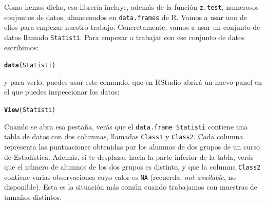 \documentclass[10pt,a4paper]{article}\usepackage[]{graphicx}\usepackage[]{color}
\makeatletter
\newcommand{\hlstd}[1]{\textcolor[rgb]{0.345,0.345,0.345}{#1}}%
\newcommand{\hlkwd}[1]{\textcolor[rgb]{0.737,0.353,0.396}{\textbf{#1}}}%
\newenvironment{kframe}{%
 \def\at@end@of@kframe{}%
 \ifinner\ifhmode%
  \def\at@end@of@kframe{\end{minipage}}%
  \begin{minipage}{\columnwidth}%
 \fi\fi%
 \def\FrameCommand##1{\hskip\@totalleftmargin \hskip-\fboxsep
 \colorbox{shadecolor}{##1}\hskip-\fboxsep
     \hskip-\linewidth \hskip-\@totalleftmargin \hskip\columnwidth}%
 \MakeFramed {\advance\hsize-\width
   \@totalleftmargin\z@ \linewidth\hsize
   \@setminipage}}%
 {\par\unskip\endMakeFramed%
 \at@end@of@kframe}
\newenvironment{knitrout}{}{} %
\newcounter {cont01}
\makeatother
\begin{document}
Como hemos dicho, esa librería incluye, además de la función {\tt z.test}, numerosos conjuntos de datos, almacenados en {\tt data.frames} de R. Vamos a usar uno de ellos para empezar nuestro trabajo. Concretamente, vamos a usar un conjunto de datos llamado {\tt Statisti}. Para empezar a trabajar con ese conjunto de datos escribimos:
\begin{knitrout}
\color{fgcolor}\begin{kframe}
\begin{alltt}
\hlkwd{data}\hlstd{(Statisti)}
\end{alltt}
\end{kframe}
\end{knitrout}
y para verlo, puedes usar este comando, que en RStudio abrirá un nuevo panel en el que puedes inspeccionar los datos:
\begin{knitrout}
\color{fgcolor}\begin{kframe}
\begin{alltt}
\hlkwd{View}\hlstd{(Statisti)}
\end{alltt}
\end{kframe}
\end{knitrout}
Cuando se abra esa pestaña, verás que el {\tt data.frame Statisti} contiene una tabla de datos con dos columnas, llamadas  {\tt Class1} y {\tt Class2}. Cada columna representa las puntuaciones obtenidas por los alumnos de dos grupos de un curso de Estadística.  Además, si te desplazas hacia la parte inferior de la tabla, verás que el número de alumnos de los dos grupos es distinto, y que la columna {\tt Class2} contiene varias observaciones cuyo valor es {\tt NA} (recuerda, {\em not available}, no disponible). Esta es la situación más común cuando trabajamos con muestras de tamaños distintos.
\end{document}
